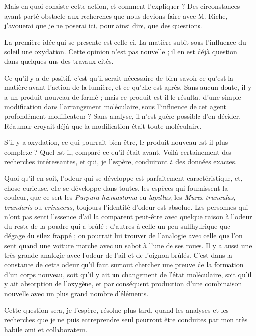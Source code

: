 \documentclass[a4paper, 11pt, oneside, polutonikogreek, french]{article}
\begin{document}
Mais en quoi consiste cette action, et comment l'expliquer ? Des circonstances ayant porté obstacle aux recherches que nous devions faire avec M. Riche, j'avouerai que je ne poserai ici, pour ainsi dire, que des questions.

La première idée qui se présente est celle-ci. La matière subit sous l'influence du soleil une oxydation. Cette opinion n'est pas nouvelle ; il en est déjà question dans quelques-uns des travaux cités.

Ce qu'il y a de positif, c'est qu'il serait nécessaire de bien savoir ce qu'est la matière avant l'action de la lumière, et ce qu'elle est après. Sans aucun doute, il y a un produit nouveau de formé ; mais ce produit est-il le résultat d'une simple modification dans l'arrangement moléculaire, sous l'influence de cet agent profondément modificateur ? Sans analyse, il n'est guère possible d'en décider. Réaumur croyait déjà que la modification était toute moléculaire.

S'il y a oxydation, ce qui pourrait bien être, le produit nouveau est-il plus complexe ? Quel est-il, comparé ce qu'il était avant. Voilà certainement des recherches intéressantes, et qui, je l'espère, conduiront à des données exactes.

Quoi qu'il en soit, l'odeur qui se développe est parfaitement caractéristique, et, chose curieuse, elle se développe dans toutes, les espèces qui fournissent la couleur, que ce soit les \emph{Purpura hæmastoma} ou \emph{lapillus}, les \emph{Murex trunculus}, \emph{brandaris} ou \emph{erinaceus}, toujours l'identité d'odeur est absolue. Les personnes qui n'ont pas senti l'essence d'ail la comparent peut-être avec quelque raison à l'odeur du reste de la poudre qui a brûlé ; d'autres à celle un peu sulfhydrique que dégage du silex frappé ; on pourrait lui trouver de l'analogie avec celle que l'on sent quand une voiture marche avec un sabot à l'une de ses roues. Il y a aussi une très grande analogie avec l'odeur de l'ail et de l'oignon brûlés. C'est dans la constance de cette odeur qu'il faut surtout chercher une preuve de la formation d'un corps nouveau, soit qu'il y ait un changement de l'état moléculaire, soit qu'il y ait absorption de l'oxygène, et par conséquent production d'une combinaison nouvelle avec un plus grand nombre d'éléments.

Cette question sera, je l'espère, résolue plus tard, quand les analyses et les recherches que je ne puis entreprendre seul pourront être conduites par mon très habile ami et collaborateur.
\end{document}
